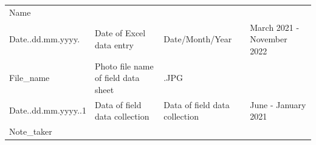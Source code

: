 \documentclass[
  12pt,
]{article}
\begin{document}
\begin{longtable}[]{@{}llll@{}}
\begin{minipage}[t]{0.19\columnwidth}
Name\strut
\end{minipage} & \begin{minipage}[t]{0.20\columnwidth}\raggedright
\strut
\end{minipage}\tabularnewline
\begin{minipage}[t]{0.13\columnwidth}\raggedright
Date..dd.mm.yyyy.\strut
\end{minipage} & \begin{minipage}[t]{0.37\columnwidth}\raggedright
Date of Excel data entry\strut
\end{minipage} & \begin{minipage}[t]{0.19\columnwidth}\raggedright
Date/Month/Year\strut
\end{minipage} & \begin{minipage}[t]{0.20\columnwidth}\raggedright
March 2021 - November 2022\strut
\end{minipage}\tabularnewline
\begin{minipage}[t]{0.13\columnwidth}\raggedright
File\_name\strut
\end{minipage} & \begin{minipage}[t]{0.37\columnwidth}\raggedright
Photo file name of field data sheet\strut
\end{minipage} & \begin{minipage}[t]{0.19\columnwidth}\raggedright
.JPG\strut
\end{minipage} & \begin{minipage}[t]{0.20\columnwidth}\raggedright
\strut
\end{minipage}\tabularnewline
\begin{minipage}[t]{0.13\columnwidth}\raggedright
Date..dd.mm.yyyy..1\strut
\end{minipage} & \begin{minipage}[t]{0.37\columnwidth}\raggedright
Data of field data collection\strut
\end{minipage} & \begin{minipage}[t]{0.19\columnwidth}\raggedright
Data of field data collection\strut
\end{minipage} & \begin{minipage}[t]{0.20\columnwidth}\raggedright
June - January 2021\strut
\end{minipage}\tabularnewline
\begin{minipage}[t]{0.13\columnwidth}\raggedright
Note\_taker\strut
\end{minipage} & \begin{minipage}[t]{0.37\columnwidth}\raggedright

\end{minipage}
\end{longtable}
\end{document}
